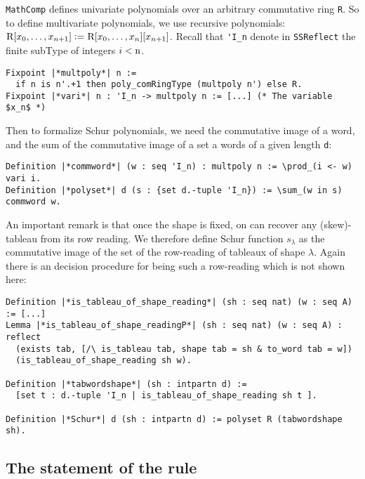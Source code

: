 \documentclass[12pt,a4paper]{article}
\let\verb=\lstinline
\newcommand{\SSR}{\texttt{SSReflect}\xspace}
\newcommand{\MC}{\texttt{MathComp}\xspace}
\newcommand{\var}[1]{\text{\verb{#1}}}
\begin{document}
\MC defines univariate polynomials over an arbitrary commutative ring
\verb{R}. So to define multivariate polynomials, we use recursive polynomials:
$\var{R}[x_0,\dots,x_{n+1}]:=\var{R}[x_0,\dots,x_n][x_{n+1}]$. Recall
that \verb{'I_n} denote in \SSR the finite subType of integers
$i < \var{n}$.
\begin{lstlisting}
Fixpoint |*multpoly*| n :=
  if n is n'.+1 then poly_comRingType (multpoly n') else R.
Fixpoint |*vari*| n : 'I_n -> multpoly n := [...] (* The variable $x_n$ *)
\end{lstlisting}
Then to formalize Schur polynomials, we need the commutative image of a word,
and the sum of the commutative image of a set a words of a given length
\verb{d}:
\begin{lstlisting}
Definition |*commword*| (w : seq 'I_n) : multpoly n := \prod_(i <- w) vari i.
Definition |*polyset*| d (s : {set d.-tuple 'I_n}) := \sum_(w in s) commword w.
\end{lstlisting}
An important remark is that once the shape is fixed, on can recover any
(skew)-tableau from its row reading. We therefore define Schur function
$s_\lambda$ as the commutative image of the set of the row-reading of tableaux
of shape $\lambda$. Again there is an decision procedure for being such a
row-reading which is not shown here:
\begin{lstlisting}
Definition |*is_tableau_of_shape_reading*| (sh : seq nat) (w : seq A) := [...]
Lemma |*is_tableau_of_shape_readingP*| (sh : seq nat) (w : seq A) : reflect
  (exists tab, [/\ is_tableau tab, shape tab = sh & to_word tab = w])
  (is_tableau_of_shape_reading sh w).

Definition |*tabwordshape*| (sh : intpartn d) :=
  [set t : d.-tuple 'I_n | is_tableau_of_shape_reading sh t ].

Definition |*Schur*| d (sh : intpartn d) := polyset R (tabwordshape sh).
\end{lstlisting}
\subsection{The statement of the rule}
\end{document}
